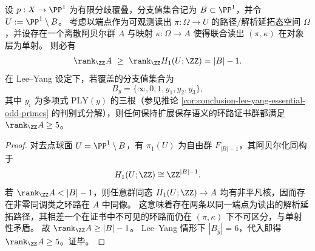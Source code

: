 \begin{theorem}[分支值结构强制的环路证书秩下界]\label{thm:conclusion-leyang-loop-certificate-rank-lower-bound}
设 \(p:X\to\PP^1\) 为有限分歧覆叠，分支值集合记为 \(B\subset\PP^1\)，并令 \(U:=\PP^1\setminus B\)。
考虑以端点作为可观测读出 \(\pi:\Omega\to U\) 的路径/解析延拓态空间 \(\Omega\)，并设存在一个离散阿贝尔群 \(A\) 与映射 \(\kappa:\Omega\to A\) 使得联合读出 \((\pi,\kappa)\) 在对象层为单射。
则必有
\[
\rank_{\ZZ}A\ \ge\ \rank_{\ZZ}H_1(U;\ZZ)=|B|-1.
\]
在 Lee--Yang 设定下，若覆盖的分支值集合为
\[
B_y=\{\infty,0,1,y_1,y_2,y_3\},
\]
其中 \(y_i\) 为多项式 \(\mathrm{PLY}(y)\) 的三根（参见推论 \ref{cor:conclusion-lee-yang-essential-odd-primes} 的判别式分解），则任何保持扩展保存语义的环路证书群都满足 \(\rank_{\ZZ}A\ge 5\)。
\end{theorem}

\begin{proof}
对去点球面 \(U=\PP^1\setminus B\)，有 \(\pi_1(U)\) 为自由群 \(F_{|B|-1}\)，其阿贝尔化同构于
\[
H_1(U;\ZZ)\cong \ZZ^{|B|-1}.
\]
若 \(\rank_{\ZZ}A<|B|-1\)，则任意群同态 \(H_1(U;\ZZ)\to A\) 均有非平凡核，因而存在非零同调类之环路在 \(A\) 中同像。
这意味着存在两条以同一端点为读出的解析延拓路径，其相差一个在证书中不可见的环路而仍在 \((\pi,\kappa)\) 下不可区分，与单射性矛盾。
故 \(\rank_{\ZZ}A\ge |B|-1\)。
Lee--Yang 情形下 \(|B_y|=6\)，代入即得 \(\rank_{\ZZ}A\ge 5\)。证毕。
\end{proof}

\endinput
